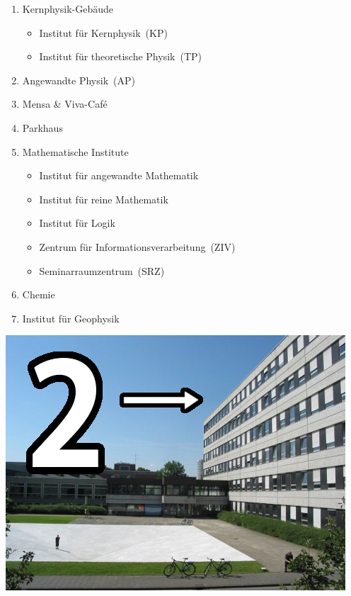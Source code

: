 {\begin{minipage}{0.54\textwidth}
	\begin{enumerate}[resume*=lageplan]
		\item Kernphysik-Gebäude
		\begin{itemize}
			\item Institut für Kernphysik~(KP)
			\item Institut für theoretische Physik~(TP)
		\end{itemize}
		\item Angewandte Physik~(AP)
		\item Mensa \& Viva-Café
		\item Parkhaus
		\item Mathematische Institute
		\begin{itemize}
			\item Institut für angewandte Mathematik
			\item Institut für reine Mathematik
			\item Institut für Logik
			\item Zentrum für Informationsverarbeitung~(ZIV)
			\item Seminarraumzentrum~(SRZ)
		\end{itemize}
		\item Chemie
		\item Institut für Geophysik
	\end{enumerate}
\end{minipage}
\hfill
\begin{minipage}{0.45\textwidth}
	\vspace{-0.5cm}
	\centering
	\includegraphics[width=\textwidth]{res/lageplan/2_KP_TP.jpg}
\end{minipage}

}
